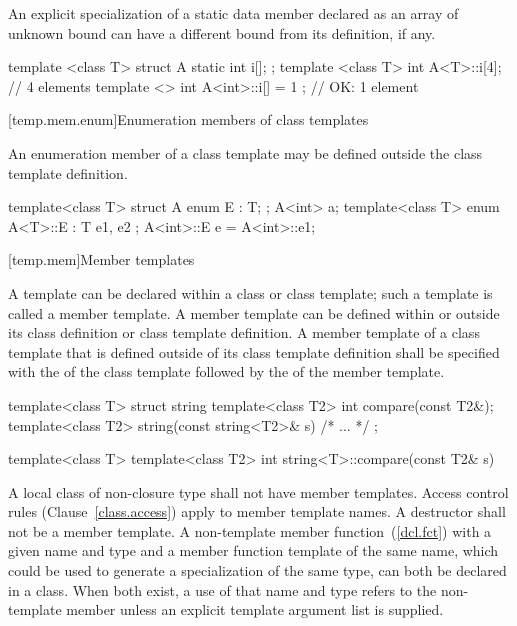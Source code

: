\pnum
An explicit specialization of a static data member declared as an array of unknown
bound can have a different bound from its definition, if any. \enterexample

\begin{codeblock}
template <class T> struct A {
  static int i[];
};
template <class T> int A<T>::i[4];    // 4 elements
template <> int A<int>::i[] = { 1 };  // OK: 1 element
\end{codeblock}
\exitexample

[temp.mem.enum]{Enumeration members of class templates}

\pnum
An enumeration member of a class template may be defined outside the class
template definition. \enterexample

\begin{codeblock}
template<class T> struct A {
  enum E : T;
};
A<int> a;
template<class T> enum A<T>::E : T { e1, e2 };
A<int>::E e = A<int>::e1;
\end{codeblock}
\exitexample

[temp.mem]{Member templates}

\pnum
A template can be declared within a class or class template; such a template
is called a member template.
A member template can be defined within or outside its class definition or
class template definition.
A member template of a class template that is defined outside of its class
template definition shall be specified with the
of the class template followed by the
of the member template.
\enterexample

\begin{codeblock}
template<class T> struct string {
  template<class T2> int compare(const T2&);
  template<class T2> string(const string<T2>& s) { /* ... */ }
};

template<class T> template<class T2> int string<T>::compare(const T2& s) {
}
\end{codeblock}
\exitexample

\pnum
A local class of non-closure type shall not have member templates.
Access control rules (Clause~\ref{class.access})
apply to member template names.
A destructor shall not be a member
template.
A non-template member function~(\ref{dcl.fct}) with a given name
and type and a member function template of the same name, which could be
used to generate a specialization of the same type, can both be
declared in a class.
When both exist, a use of that name and type refers to the
non-template member unless an explicit template argument list is supplied.
\enterexample

